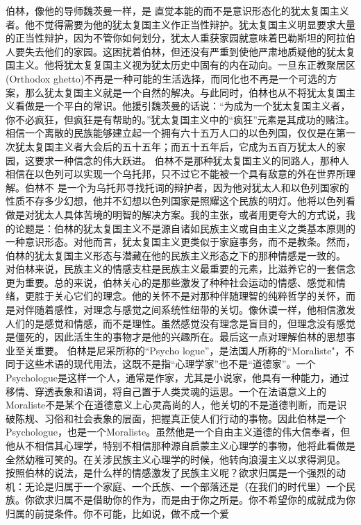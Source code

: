\documentclass{article}
\begin{document}
     伯林，像他的导师魏茨曼一样，是
\newpage
直觉本能的而不是意识形态化的犹太复国主义者。他不觉得需要为他的犹太复国主义作正当性辩护。犹太复国主义明显要求大量的正当性辩护，因为不管你如何划分，犹太人重获家园就意味着巴勒斯坦的阿拉伯人要失去他们的家园。这困扰着伯林，但还没有严重到使他严肃地质疑他的犹太复国主义。他将犹太复复国主义视为犹太历史中固有的内在动向。一旦东正教聚居区(Orthodox ghetto)不再是一种可能的生活选择，而同化也不再是一个可选的方案，那么犹太复国主义就是一个自然的解决。与此同时，伯林也从不将犹太复国主义看做是一个平白的常识。他援引魏茨曼的话说：“为成为一个犹太复国主义者，你不必疯狂，但疯狂是有帮助的。”犹太复国主义中的“疯狂”元素是其成功的赌注。相信一个离散的民族能够建立起一个拥有六十五万人口的以色列国，仅仅是在第一次犹太复国主义者大会后的五十五年；而五十五年后，它成为五百万犹太人的家园，这要求一种信念的伟大跃进。
     伯林不是那种犹太复国主义的同路人，那种人相信在以色列可以实现一个乌托邦，只不过它不能被一个具有敌意的外在世界所理解。伯林不
\newpage
是一个为乌托邦寻找托词的辩护者，因为他对犹太人和以色列国家的性质不存多少幻想，他并不幻想以色列国家是照耀这个民族的明灯。他将以色列看做是对犹太人具体苦境的明智的解决方案。我的主张，或者用更夸大的方式说，我的论题是：伯林的犹太复国主义不是源自诸如民族主义或自由主义之类基本原则的一种意识形态。对他而言，犹太复国主义更类似于家庭事务，而不是教条。然而，伯林的犹太复国主义形态与潜藏在他的民族主义形态之下的那种情感是一致的。
     对伯林来说，民族主义的情感支柱是民族主义最重要的元素，比滋养它的一套信念更为重要。总的来说，伯林关心的是那些激发了种种社会运动的情感、感觉和情绪，更胜于关心它们的理念。他的关怀不是对那种伴随理智的纯粹哲学的关怀，而是对伴随着感性，对理念与感觉之间系统性纽带的关切。像休谟一样，他相信激发人们的是感觉和情感，而不是理性。虽然感觉没有理念是盲目的，但理念没有感觉是僵死的，因此活生生的事物才是他的兴趣所在。最后这一点对理解伯林的思想事业至关重要。
     伯林是尼采所称的“Psycho
\newpage
logue”，是法国人所称的“Moraliste"，不同于这些术语的现代用法，这既不是指“心理学家”也不是“道德家”。一个Psychologue是这样一个人，通常是作家，尤其是小说家，他具有一种能力，通过移情、穿透表象和语词，将自己置于人类灵魂的运思。一个在法语意义上的Moraliste不是某个在道德意义上心灵高尚的人，他关切的不是道德判断，而是识破陈规、习俗和社会表象的层面，把握真正使人们行动的事物。因此伯林是一个Psychologue，也是一个Moraliste。虽然他是一个自由主义道德的伟大信奉者，但他从不相信其心理学，特别不相信那种源自启蒙主义心理学的事物，他将此看做是全然幼稚可笑的。在关涉民族主义心理学的时候，他转向浪漫主义以求得洞见。
     按照伯林的说法，是什么样的情感激发了民族主义呢？欲求归属是一个强烈的动机：无论是归属于一个家庭、一个氏族、一个部落还是（在我们的时代里）一个民族。你欲求归属不是借助你的作为，而是由于你之所是。你不希望你的成就成为你归属的前提条件。你不可能，比如说，做不成一个爱
\end{document}
